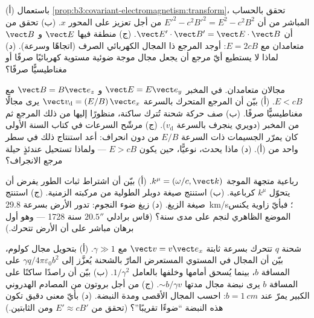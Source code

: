 \begin{exercise}[$\star\star$]\label{exo:b3:covariant-electromagnetism:6}
(أ) باستعمال \cref{prop:b3:covariant-electromagnetism:transform}، تحقق
بالحساب المباشر من أن $E'^2 - c^2B'^2 = E^2 - c^2B^2$ من أجل
تعزيز على المحور $x$. (ب) تحقق من أن $\vect E'\cdot\vect B' = \vect
E\cdot\vect B$. (ج) منطقة فيها $\vect E$ و $\vect B$
متعامدان مع $E = 2cB$: أوجد المرجع ذا المجال الكهربائي
الصرف (اتجاهًا وسرعة). (د) لماذا لا يستطيع أيّ مرجع أن يجعل مجال
موجة ضوئية مستوية كهربائيًا صرفًا أو مغناطيسيًّا صرفًا؟
\end{exercise}

\begin{exercise}[$\star\star$]\label{exo:b3:covariant-electromagnetism:7}
مجالان متعامدان. في المخبر $\vect E = E\vect e_y$ و $\vect B =
B\vect e_z$ مع $E < cB$. (أ) بيّن أن المرجع المتحرك بالسرعة
$\vect v_{\text{d}} = (E/B)\,\vect e_x$ يرى مجالًا مغناطيسيًّا صرفًا.
(ب) صف حركة شحنة تُترك ساكنة، منظورًا إليها من ذلك
المرجع ثم من المخبر (دويري ينجرف بالسرعة $v_{\text{d}}$). (ج)
مرشّح السرعات في كتاب السنة الأولى كان يمرّر الجسيمات ذات السرعة
$E/B$ من دون انحراف: أعد استنتاج ذلك في سطر واحد من (أ). (د) ماذا
يحدث، نوعيًّا، حين يكون $E > cB$ --- ولماذا تستحيل عندئذٍ حيلة
مرجع الانجراف؟
\end{exercise}

\begin{exercise}[$\star\star$]\label{exo:b3:covariant-electromagnetism:8}
رباعية متجهة الموجة $k^\mu = (\omega/c, \vect k)$. (أ) بيّن أن
اشتراط ثبات الطور يفرض أن يتحوّل $k^\mu$ كرباعية.
(ب) استنتج صيغة دوبلر الطولية من مركبته
الزمنية. (ج) استنتج صيغة الزيغ. (د) زيغ ضوء
النجوم: تدور الأرض بسرعة \qty{29.8}{km/s}؛ فبأيّ زاوية يكنس
الموضع الظاهري لنجم على مدى سنة؟ (قاس برادلي
$20.5''$ سنة 1728 --- وهو أول برهان مباشر على أن الأرض تتحرك.)
\end{exercise}

\begin{exercise}[$\star\star$]\label{exo:b3:covariant-electromagnetism:9}
شحنة $q$ تتحرك بسرعة ثابتة $\vect v = v\vect e_x$ مع $\gamma \gg
1$. (أ) بتحويل مجال كولوم، بيّن أن المجال في المستوي
المستعرض المارّ بالشحنة يُعزَّز إلى $\gamma
q/4\pi\varepsilon_0b^2$ على المسافة $b$، بينما يُسحق أمامها
وخلفها بالعامل $1/\gamma^2$. (ب) بيّن أن راصدًا
ساكنًا على المسافة $b$ يرى نبضة مجال مدتها
$\sim b/\gamma v$. (ج) من أجل بروتون من المصادم الهدروني الكبير يمرّ عند $b = \qty{1}{cm}$:
احسب المجال الأقصى ومدة النبضة. (د) بأيّ معنى دقيق تكون هذه
النبضة ``ضوءًا تقريبًا''؟ (تحقق من $E' \approx cB'$ ومن الثابتين.)
\end{exercise}

